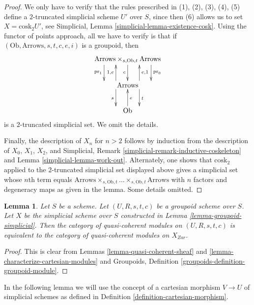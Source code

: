 \documentclass{stacks-project}
\theoremstyle{plain}
\newtheorem{lemma}[subsection]{Lemma}
\theoremstyle{definition}
\theoremstyle{remark}
\numberwithin{equation}{subsection}
\begin{document}
\begin{proof}
We only have to verify that the rules prescribed in (1), (2), (3), (4), (5)
define a $2$-truncated simplicial scheme $U'$ over $S$, since then (6)
allows us to set $X = \text{cosk}_2 U'$, see
Simplicial, Lemma \ref{simplicial-lemma-existence-cosk}.
Using the functor of points approach, all we have to verify is that
if $(\text{Ob}, \text{Arrows}, s, t, c, e, i)$ is a groupoid, then
$$
\xymatrix{
\text{Arrows} \times_{s, \text{Ob}, t} \text{Arrows}
\ar@<8ex>[d]^{\text{pr}_0}
\ar@<0ex>[d]_c
\ar@<-8ex>[d]_{\text{pr}_1}
\\
\text{Arrows}
\ar@<4ex>[d]^t
\ar@<-4ex>[d]_s
\ar@<4ex>[u]^{1, e}
\ar@<-4ex>[u]_{e, 1}
\\
\text{Ob}
\ar@<0ex>[u]_e
}
$$
is a $2$-truncated simplicial set. We omit the details.

\medskip\noindent
Finally, the description of $X_n$ for $n > 2$ follows by induction from
the description of $X_0$, $X_1$, $X_2$, and
Simplicial, Remark \ref{simplicial-remark-inductive-coskeleton} and
Lemma \ref{simplicial-lemma-work-out}. Alternately, one shows that
$\text{cosk}_2$ applied to the $2$-truncated simplicial set displayed above
gives a simplicial set whose $n$th term equals
$\text{Arrows} \times_{s, \text{Ob}, t} \ldots \times_{s, \text{Ob}, t}
\text{Arrows}$ with $n$ factors and degeneracy maps as given in the lemma.
Some details omitted.
\end{proof}

\begin{lemma}
\label{lemma-quasi-coherent-groupoid-simplicial}
Let $S$ be a scheme. Let $(U, R, s, t, c)$ be a groupoid scheme
over $S$. Let $X$ be the simplicial scheme over $S$ constructed
in Lemma \ref{lemma-groupoid-simplicial}.
Then the category of quasi-coherent modules on $(U, R, s, t, c)$
is equivalent to the category of quasi-coherent modules on $X_{Zar}$.
\end{lemma}

\begin{proof}
This is clear from Lemmas
\ref{lemma-quasi-coherent-sheaf} and
\ref{lemma-characterize-cartesian-modules}
and Groupoids, Definition \ref{groupoids-definition-groupoid-module}.
\end{proof}

\noindent
In the following lemma we will use the concept of a cartesian
morphism $V \to U$ of simplicial schemes as defined in
Definition \ref{definition-cartesian-morphism}.
\end{document}
